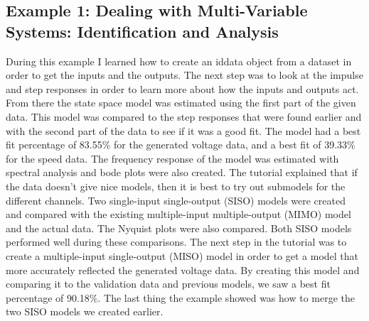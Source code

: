 \documentclass[letterpaper,12pt]{article}   %
\begin{document}
\subsection{Example 1: Dealing with Multi-Variable Systems: Identification and Analysis}
\label{sec:sysID-Example1}
During this example I learned how to create an iddata object from a dataset in order to get the inputs and the outputs. The next step was to look at the impulse and step responses in order to learn more about how the inputs and outputs act. From there the state space model was estimated using the first part of the given data. This model was compared to the step responses that were found earlier and with the second part of the data to see if it was a good fit. The model had a best fit percentage of 83.55\% for the generated voltage data, and a best fit of 39.33\% for the speed data. The frequency response of the model was estimated with spectral analysis and bode plots were also created. The tutorial explained that if the data doesn’t give nice models, then it is best to try out submodels for the different channels. Two single-input single-output (SISO) models were created and compared with the existing multiple-input multiple-output (MIMO) model and the actual data. The Nyquist plots were also compared. Both SISO models performed well during these comparisons. The next step in the tutorial was to create a multiple-input single-output (MISO) model in order to get a model that more accurately reflected the generated voltage data. By creating this model and comparing it to the validation data and previous models, we saw a best fit percentage of 90.18\%. The last thing the example showed was how to merge the two SISO models we created earlier.
\end{document}
